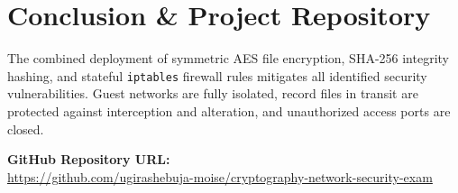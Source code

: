 \documentclass[12pt,a4paper]{article}
\begin{document}
\section{Conclusion \& Project Repository}

The combined deployment of symmetric AES file encryption, SHA-256 integrity hashing, and stateful \texttt{iptables} firewall rules mitigates all identified security vulnerabilities. Guest networks are fully isolated, record files in transit are protected against interception and alteration, and unauthorized access ports are closed.

\vspace{0.6em}
\noindent\textbf{GitHub Repository URL:} \\
\url{https://github.com/ugirashebuja-moise/cryptography-network-security-exam}
\end{document}
